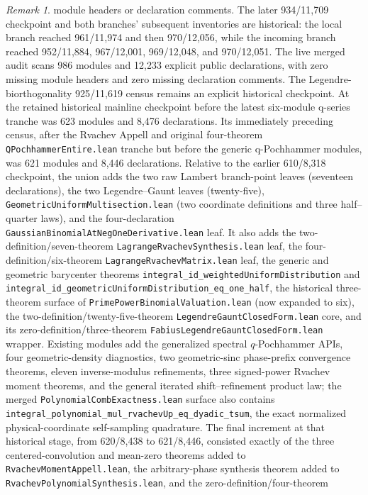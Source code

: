 \documentclass[11pt,oneside]{article}
\theoremstyle{definition}
\theoremstyle{remark}
\newtheorem{remark}[theorem]{Remark}
\begin{document}
\begin{remark}
module headers or declaration comments.  The later 934/11,709 checkpoint
and both branches' subsequent inventories are historical: the local branch
reached 961/11,974 and then 970/12,056, while the incoming branch reached
952/11,884, 967/12,001, 969/12,048, and 970/12,051.
The live merged audit scans 986 modules and 12,233 explicit public
declarations, with zero missing module headers and zero missing declaration
comments.  The Legendre-biorthogonality 925/11,619 census remains an explicit
historical checkpoint.  At the retained historical
mainline checkpoint before the latest
six-module q-series tranche was 623 modules and 8,476 declarations.  Its
immediately preceding census, after the Rvachev Appell and original
four-theorem \nolinkurl{QPochhammerEntire.lean} tranche but before the generic
q-Pochhammer modules, was 621 modules and 8,446 declarations.  Relative to the
earlier 610/8,318 checkpoint,
the union adds the two raw Lambert branch-point leaves (seventeen
declarations), the two Legendre--Gaunt leaves (twenty-five),
\nolinkurl{GeometricUniformMultisection.lean} (two coordinate definitions and
three half--quarter laws), and the four-declaration
\nolinkurl{GaussianBinomialAtNegOneDerivative.lean} leaf.  It also adds the
two-definition/seven-theorem \nolinkurl{LagrangeRvachevSynthesis.lean} leaf,
the four-definition/six-theorem \nolinkurl{LagrangeRvachevMatrix.lean} leaf,
the generic and geometric barycenter theorems
\nolinkurl{integral_id_weightedUniformDistribution} and
\nolinkurl{integral_id_geometricUniformDistribution_eq_one_half},
the historical three-theorem surface of
\nolinkurl{PrimePowerBinomialValuation.lean} (now expanded to six), the
two-definition/twenty-five-theorem \nolinkurl{LegendreGauntClosedForm.lean}
core, and its zero-definition/three-theorem
\nolinkurl{FabiusLegendreGauntClosedForm.lean} wrapper.  Existing modules add
the generalized spectral $q$-Pochhammer APIs, four geometric-density
diagnostics, two geometric-sinc phase-prefix convergence theorems, eleven
inverse-modulus refinements, three signed-power Rvachev moment theorems, and
the general iterated shift--refinement product law; the merged
\nolinkurl{PolynomialCombExactness.lean} surface also contains
\nolinkurl{integral_polynomial_mul_rvachevUp_eq_dyadic_tsum}, the exact
normalized physical-coordinate self-sampling quadrature.  The final increment
at that historical stage, from 620/8,438 to 621/8,446, consisted exactly of the three centered-convolution
and mean-zero theorems added to \nolinkurl{RvachevMomentAppell.lean}, the
arbitrary-phase synthesis theorem added to
\nolinkurl{RvachevPolynomialSynthesis.lean}, and the zero-definition/four-theorem

\end{remark}
\end{document}
